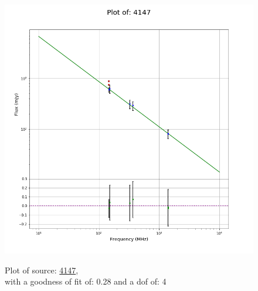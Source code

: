 \documentclass{article}
\begin{document}
\begin{figure}[H]
    \centering
    \begin{minipage}{.5\textwidth}
        \centering
        \includegraphics[scale = 0.35]{KmeulenSimSource_1hr/1hr4147.png}
        \captionsetup{labelformat=empty}
        \caption{Plot of source: \href{http://banana.transientskp.org/r4/vlo_KmeulenSimSource/runningcatalog/4147}{4147},\\with a goodness of fit of: 0.28 and a dof of: 4}
        \addtocounter{figure}{-1}
        \label{KmeulenSimSource:1hr:4147:plot}
    \end{minipage}%
    \begin{minipage}{0.5\textwidth}
        \centering


\end{minipage}
\end{figure}
\end{document}
